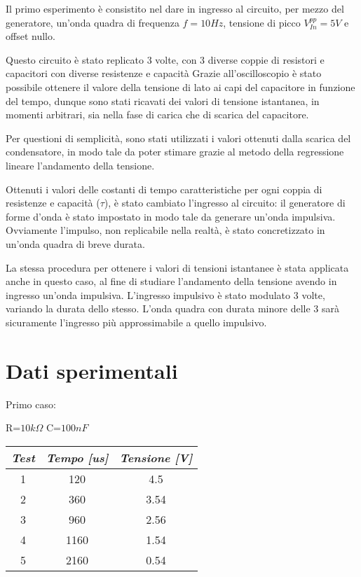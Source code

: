     Il primo esperimento è consistito nel dare in ingresso al circuito, per mezzo del generatore,
    un'onda quadra di frequenza $f = 10Hz$, tensione di picco $V_{In}^{pp} = 5V$ e offset nullo.\par
    Questo circuito è stato replicato 3 volte, con 3 diverse coppie di resistori e capacitori con diverse
    resistenze e capacità
    Grazie all'oscilloscopio è stato possibile ottenere il valore della tensione di lato ai capi 
    del capacitore in funzione del tempo, dunque sono stati ricavati dei valori di tensione istantanea,
    in momenti arbitrari, sia nella fase di carica che di scarica del capacitore.  \par
    Per questioni di semplicità, sono stati utilizzati i valori ottenuti dalla scarica del condensatore, in modo tale
    da poter stimare grazie al metodo della regressione lineare l'andamento della tensione.\par
    Ottenuti i valori delle costanti di tempo caratteristiche per ogni coppia di resistenze e capacità ($\tau$),
    è stato cambiato l'ingresso al circuito: il generatore di forme d'onda è stato impostato in modo tale da generare
    un'onda impulsiva. Ovviamente l'impulso, non replicabile nella realtà, è stato concretizzato in un'onda quadra di breve
    durata. \par
    La stessa procedura per ottenere i valori di tensioni istantanee è stata applicata anche in questo caso,
    al fine di studiare l'andamento della tensione avendo in ingresso un'onda impulsiva.
    L'ingresso impulsivo è stato modulato 3 volte, variando la durata dello stesso.
    L'onda quadra con durata minore delle 3 sarà sicuramente l'ingresso più approssimabile a quello impulsivo. \par
    

    \section{Dati sperimentali}
    \begin{center}
        Primo caso: \par
        R=$10k\Omega$ C=$100nF$
    \end{center}
    \begin{center}
    \begin{tabular}{|c|c|c|}
        \hline
        \textit{Test} & \textit{Tempo [us]} & \textit{Tensione [V]} \\
        \hline
        1 & 120 & 4.5 \\
        \hline
        2 & 360 & 3.54 \\
        \hline
        3 & 960 & 2.56 \\
        \hline
        4 & 1160 & 1.54 \\
        \hline
        5 & 2160 & 0.54 \\
        \hline
    \end{tabular}
    \end{center}
    
